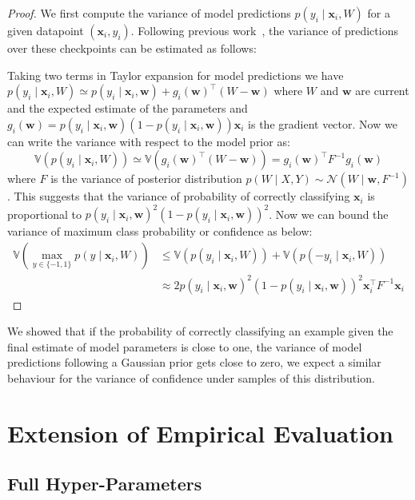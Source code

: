 \begin{proof}
We first compute the variance of model predictions $p(y_i \mid \bm{x}_i, W)$ for a given datapoint $(\bm{x}_i, y_i)$. Following previous work~\citep{schein2007active, chang2017active}, the variance of predictions over these checkpoints can be estimated as follows:

Taking two terms in Taylor expansion for model predictions we have $p(y_i \mid \bm{x}_i, W) \simeq p(y_i \mid \bm{x}_i, \bm{w}) + g_i(\bm{w})^\top (W - \bm{w})$ where $W$ and $\bm{w}$ are current and the expected estimate of the parameters and $g_i(\bm{w}) = p(y_i \mid \bm{x}_i, \bm{w}) (1 - p(y_i \mid \bm{x}_i, \bm{w}))\bm{x}_i $ is the gradient vector. Now we can write the variance with respect to the model prior as: 
$$ \mathbb{V}\left( p(y_i \mid \bm{x}_i, W) \right ) \simeq \mathbb{V}\left( g_i(\bm{w})^\top (W - \bm{w}) \right ) =  g_i(\bm{w})^\top F^{-1}  g_i(\bm{w})$$ where $F$ is the variance of posterior distribution $p(W \mid X, Y) \sim \mathcal{N}(W \mid \bm{w}, F^{-1})$. 
This suggests that the variance of probability of correctly classifying $\bm{x}_i$ is proportional to $p(y_i \mid \bm{x}_i, \bm{w})^2 (1 - p(y_i \mid \bm{x}_i, \bm{w}))^2$. Now we can bound the variance of maximum class probability or confidence as below:
\begin{align*}
  \mathbb{V}\left( \max_{y \in \{-1, 1\}} p(y \mid \bm{x}_i, W) \right ) & \leq  \mathbb{V}\left( p(y_i \mid \bm{x}_i, W) \right ) +  \mathbb{V}\left( p(- y_i \mid \bm{x}_i, W) \right ) \\
  & \approx 2 p(y_i \mid \bm{x}_i, \bm{w})^2 (1 - p(y_i \mid \bm{x}_i, \bm{w}))^2 \bm{x}_i^\top F^{-1} \bm{x}_i 
\end{align*}
\end{proof}
We showed that if the probability of correctly classifying an example given the final estimate of model parameters is close to one, the variance of model predictions following a Gaussian prior gets close to zero, we expect a similar behaviour for the variance of confidence under samples of this distribution. 

\section{Extension of Empirical Evaluation}

\subsection{Full Hyper-Parameters }
\label{app:baseline_hyperparams}


